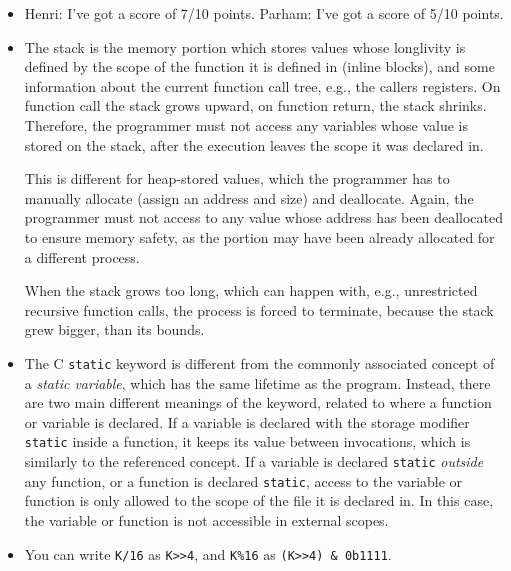 


\maketitle


\begin{exercise}[C Programming] \hfill
    \begin{itemize}
        \item[Q1] Henri: I've got a score of 7/10 points.
            Parham: I've got a score of 5/10 points.

        \item[Q2] The stack is the memory portion which stores values whose longlivity is defined by the scope of the function it is defined in (inline blocks), and some information about the current function call tree, e.g., the callers registers.
            On function call the stack grows upward, on function return, the stack shrinks.
            Therefore, the programmer must not access any variables whose value is stored on the stack, after the execution leaves the scope it was declared in.

            This is different for heap-stored values, which the programmer has to manually allocate (assign an address and size) and deallocate.
            Again, the programmer must not access to any value whose address has been deallocated to ensure memory safety, as the portion may have been already allocated for a different process.

            When the stack grows too long, which can happen with, e.g., unrestricted recursive function calls, the process is forced to terminate, because the stack grew bigger, than its bounds.

        \item[Q3] The C \lstinline|static| keyword is different from the commonly associated concept of a \emph{static variable}, which has the same lifetime as the program.
            Instead, there are two main different meanings of the keyword, related to where a function or variable is declared.
            If a variable is declared with the storage modifier \lstinline|static| inside a function, it keeps its value between invocations, which is similarly to the referenced concept.
            If a variable is declared \lstinline|static| \emph{outside} any function, or a function is declared \lstinline|static|, access to the variable or function is only allowed to the scope of the file it is declared in.
            In this case, the variable or function is not accessible in external scopes.

        \item[Q4] You can write \lstinline|K/16| as \lstinline|K>>4|, and \lstinline|K%16| as \lstinline|(K>>4) & 0b1111|.
    \end{itemize}
\end{exercise}

